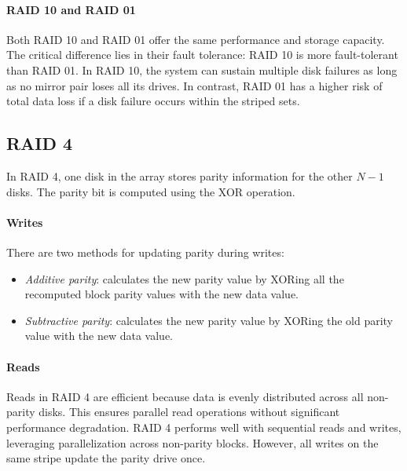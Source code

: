 \paragraph*{RAID 10 and RAID 01}
Both RAID 10 and RAID 01 offer the same performance and storage capacity. 
The critical difference lies in their fault tolerance: RAID 10 is more fault-tolerant than RAID 01. 
In RAID 10, the system can sustain multiple disk failures as long as no mirror pair loses all its drives.
In contrast, RAID 01 has a higher risk of total data loss if a disk failure occurs within the striped sets.

\subsection{RAID 4}
In RAID 4, one disk in the array stores parity information for the other $N-1$ disks. 
The parity bit is computed using the XOR operation.

\paragraph*{Writes}
There are two methods for updating parity during writes:
\begin{itemize}
    \item \textit{Additive parity}: calculates the new parity value by XORing all the recomputed block parity values with the new data value.
    \item \textit{Subtractive parity}: calculates the new parity value by XORing the old parity value with the new data value.
\end{itemize}

\paragraph*{Reads}
Reads in RAID 4 are efficient because data is evenly distributed across all non-parity disks. 
This ensures parallel read operations without significant performance degradation.
RAID 4 performs well with sequential reads and writes, leveraging parallelization across non-parity blocks. 
However, all writes on the same stripe update the parity drive once.


